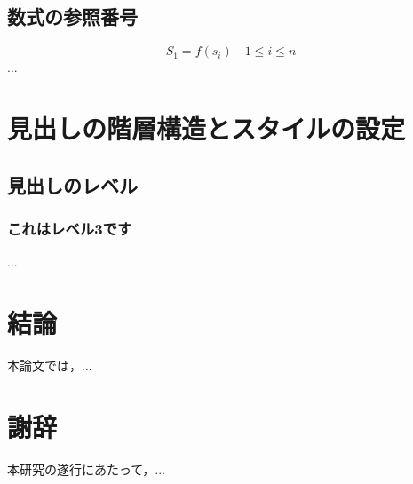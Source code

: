 \documentclass[titlepage,12pt]{ltjsarticle}
\begin{document}
\subsection{数式の参照番号}
\begin{equation}
    S_1 = f(s_i) \quad 1 \leq i \leq n
\end{equation}
...

\section{見出しの階層構造とスタイルの設定}
\subsection{見出しのレベル}
\subsubsection{これはレベル3です}
...

\section{結論}
本論文では，...

\section*{謝辞}
本研究の遂行にあたって，...


\end{document}
